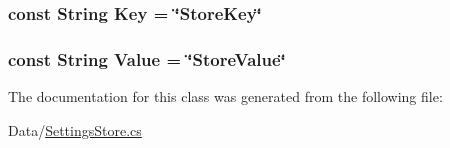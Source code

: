 \subsubsection[{Key}]{\setlength{\rightskip}{0pt plus 5cm}const String Key = \char`\"{}Store\+Key\char`\"{}}\label{classOTA_1_1Data_1_1SettingsStore_1_1SettingsTable_1_1ColumnNames_a921b4f51b4d5db174ecb9f947b96619b}
\hypertarget{classOTA_1_1Data_1_1SettingsStore_1_1SettingsTable_1_1ColumnNames_ae064bda3fea88be839f0e1b310c4ee5a}{}
\subsubsection[{Value}]{\setlength{\rightskip}{0pt plus 5cm}const String Value = \char`\"{}Store\+Value\char`\"{}}\label{classOTA_1_1Data_1_1SettingsStore_1_1SettingsTable_1_1ColumnNames_ae064bda3fea88be839f0e1b310c4ee5a}


The documentation for this class was generated from the following file\+:\begin{DoxyCompactItemize}
\item 
Data/\hyperlink{SettingsStore_8cs}{Settings\+Store.\+cs}\end{DoxyCompactItemize}
